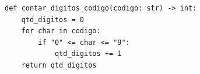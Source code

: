 \ifmostrarGabarito
\begin{verbatim}
def contar_digitos_codigo(codigo: str) -> int:
    qtd_digitos = 0
    for char in codigo:
        if "0" <= char <= "9":
            qtd_digitos += 1
    return qtd_digitos
\end{verbatim}

\fi
